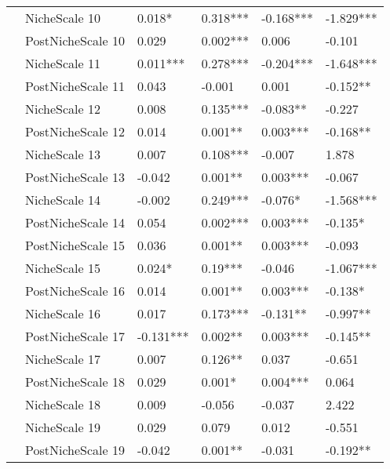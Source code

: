 \begin{table}[h!]
\begin{tabular}{llllll}
     & NicheScale 10 &  0.018* &  0.318*** &  -0.168*** &  -1.829*** \\
     & PostNicheScale 10 &  0.029 &  0.002*** &  0.006 &  -0.101 \\
     & NicheScale 11 &  0.011*** &  0.278*** &  -0.204*** &  -1.648*** \\
     & PostNicheScale 11 &  0.043 &  -0.001 &  0.001 &  -0.152** \\
     & NicheScale 12 &  0.008 &  0.135*** &  -0.083** &  -0.227 \\
     & PostNicheScale 12 &  0.014 &  0.001** &  0.003*** &  -0.168** \\
     & NicheScale 13 &  0.007 &  0.108*** &  -0.007 &  1.878 \\
     & PostNicheScale 13 &  -0.042 &  0.001** &  0.003*** &  -0.067 \\
     & NicheScale 14 &  -0.002 &  0.249*** &  -0.076* &  -1.568*** \\
     & PostNicheScale 14 &  0.054 &  0.002*** &  0.003*** &  -0.135* \\
     & PostNicheScale 15 &  0.036 &  0.001** &  0.003*** &  -0.093 \\
     & NicheScale 15 &  0.024* &  0.19*** &  -0.046 &  -1.067*** \\
     & PostNicheScale 16 &  0.014 &  0.001** &  0.003*** &  -0.138* \\
     & NicheScale 16 &  0.017 &  0.173*** &  -0.131** &  -0.997** \\
     & PostNicheScale 17 &  -0.131*** &  0.002** &  0.003*** &  -0.145** \\
     & NicheScale 17 &  0.007 &  0.126** &  0.037 &  -0.651 \\
     & PostNicheScale 18 &  0.029 &  0.001* &  0.004*** &  0.064 \\
     & NicheScale 18 &  0.009 &  -0.056 &  -0.037 &  2.422 \\
     & NicheScale 19 &  0.029 &  0.079 &  0.012 &  -0.551 \\
     & PostNicheScale 19 &  -0.042 &  0.001** &  -0.031 &  -0.192** \\
\bottomrule
\end{tabular}
\end{table}
